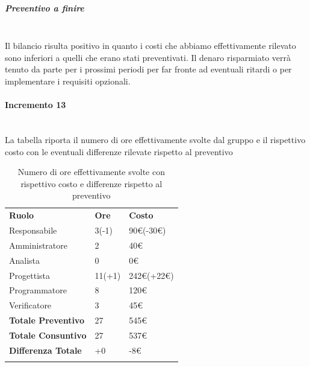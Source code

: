 \subparagraph*{Preventivo a finire} \mbox{} \\
Il bilancio risulta positivo in quanto i costi che abbiamo effettivamente rilevato sono inferiori a quelli che erano stati preventivati. Il denaro risparmiato verrà tenuto da parte per i prossimi periodi per far fronte ad eventuali ritardi o per implementare i requisiti opzionali.



\paragraph*{Incremento 13} \mbox{} \\
La tabella riporta il numero di ore effettivamente svolte dal gruppo e il rispettivo costo con le eventuali differenze rilevate rispetto al preventivo
\begin{longtable} {							
		>{}p{40mm}  
		>{}p{20mm}	
		>{}p{28mm}			
	}			
	\rowcolor{gray!50}
	
	\textbf{Ruolo}            & \textbf{Ore} & \textbf{Costo}       \TBstrut \\
	Responsabile              & 3(-1)        & 90\euro(-30\euro)    \TBstrut \\
	Amministratore            & 2            & 40\euro              \TBstrut \\
	Analista                  & 0            & 0\euro               \TBstrut \\
	Progettista               & 11(+1)       & 242\euro(+22\euro)   \TBstrut \\
	Programmatore             & 8            & 120\euro             \TBstrut \\
	Verificatore              & 3            & 45\euro              \TBstrut \\
	\textbf{Totale Preventivo}& 27           & 545\euro             \TBstrut \\	
	\textbf{Totale Consuntivo}& 27           & 537\euro             \TBstrut \\	
	\textbf{Differenza Totale}& +0           & -8\euro              \TBstrut \\
	\rowcolor{white}
	\caption{Numero di ore effettivamente svolte con rispettivo costo e differenze rispetto al preventivo}	
\end{longtable}

